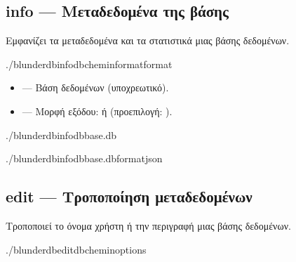 \documentclass[letterpaper,10pt,greek]{sphinxmanual}
\begin{document}
\subsection{info — Μεταδεδομένα της βάσης}
\label{\detokenize{cli:info-metadonnees-de-la-base}}
\sphinxAtStartPar
Εμφανίζει τα μεταδεδομένα και τα στατιστικά μιας βάσης δεδομένων.

\begin{sphinxVerbatim}[commandchars=\\\{\}]
./blunderdbinfo\PYGZhy{}\PYGZhy{}db\PYGZlt{}chemin\PYGZgt{}\PYG{o}{[}\PYGZhy{}\PYGZhy{}format\PYGZlt{}format\PYGZgt{}\PYG{o}{]}
\end{sphinxVerbatim}

\sphinxAtStartPar
{}
\begin{itemize}
\item {} 
\sphinxAtStartPar
{} — Βάση δεδομένων (υποχρεωτικό).

\item {} 
\sphinxAtStartPar
{} — Μορφή εξόδου:  ή  (προεπιλογή: ).

\end{itemize}

\sphinxAtStartPar
{}

\begin{sphinxVerbatim}[commandchars=\\\{\}]
./blunderdbinfo\PYGZhy{}\PYGZhy{}dbbase.db

./blunderdbinfo\PYGZhy{}\PYGZhy{}dbbase.db\PYGZhy{}\PYGZhy{}formatjson
\end{sphinxVerbatim}


\subsection{edit — Τροποποίηση μεταδεδομένων}
\label{\detokenize{cli:edit-modifier-les-metadonnees}}
\sphinxAtStartPar
Τροποποιεί το όνομα χρήστη ή την περιγραφή μιας βάσης δεδομένων.

\begin{sphinxVerbatim}[commandchars=\\\{\}]
./blunderdbedit\PYGZhy{}\PYGZhy{}db\PYGZlt{}chemin\PYGZgt{}\PYG{o}{[}options\PYG{o}{]}
\end{sphinxVerbatim}
\end{document}
